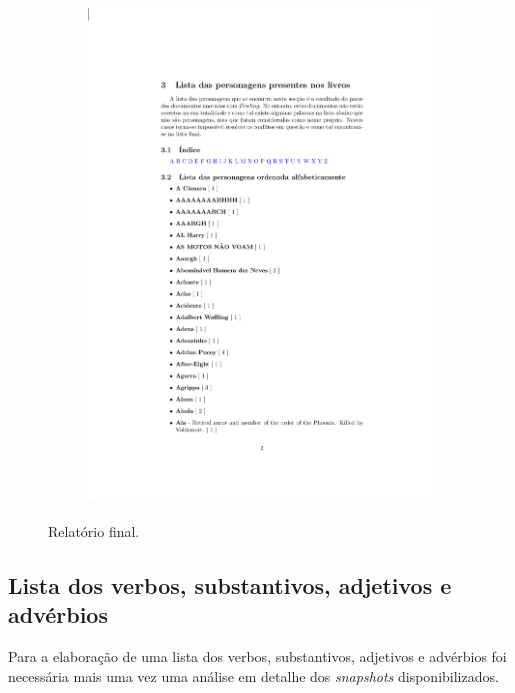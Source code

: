 \documentclass[a4paper]{article}
\begin{document}
\begin{figure}[h]
\begin{subfigure}{0.5\textwidth}
		\includegraphics[width=1.3\linewidth]{list_pers.png}
	\end{subfigure}
	\caption{Relatório final.}
	\label{fig:relatorio_final}
\end{figure}

\newpage

\subsection{Lista dos verbos, substantivos, adjetivos e advérbios}

\hspace{3mm} Para a elaboração de uma lista dos verbos, substantivos, adjetivos e advérbios foi necessária mais uma vez uma análise em detalhe dos \emph{snapshots} disponibilizados.
\end{document}
